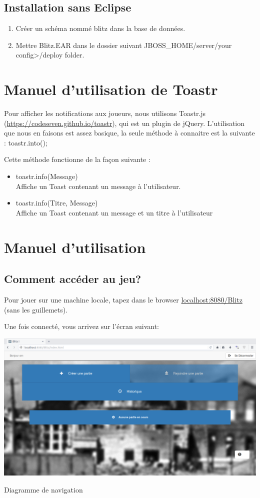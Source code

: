\documentclass[11pt]{scrreprt}
\begin{document}
    \subsection{Installation sans Eclipse}
    \begin{enumerate}
        \item Créer un schéma nommé \og blitz\fg{} dans la base de données.
        \item Mettre Blitz.EAR dans le dossier suivant JBOSS\_HOME/server/your config>/deploy folder.
    \end{enumerate}

    \section{Manuel d'utilisation de Toastr}
    Pour afficher les notifications aux joueurs, nous utilisons Toastr.js (\url{https://codeseven.github.io/toastr}), qui est un plugin de jQuery. L'utilisation que nous en faisons est assez basique, la seule méthode à connaitre est la suivante : toastr.into();

    Cette méthode fonctionne de la façon suivante :

    \begin{itemize}
        \item toastr.info(\og Message\fg)\\ Affiche un Toast contenant un message à l'utilisateur.
        \item toastr.info(\og Titre\fg, \og Message\fg)\\ Affiche un Toast contenant un message et un titre à l'utilisateur
    \end{itemize}
    \section{Manuel d'utilisation}
    \subsection{Comment accéder au jeu?}
    Pour jouer sur une machine locale, tapez dans le browser \og \url{localhost:8080/Blitz}\fg{} (sans les guillemets).

    Une fois connecté, vous arrivez sur l'écran suivant:

    \begin{table}[H]
        \centering
        \includegraphics[width=\textwidth]{images/accueil.png}
        \caption{Diagramme de navigation}
    \end{table}
\end{document}
